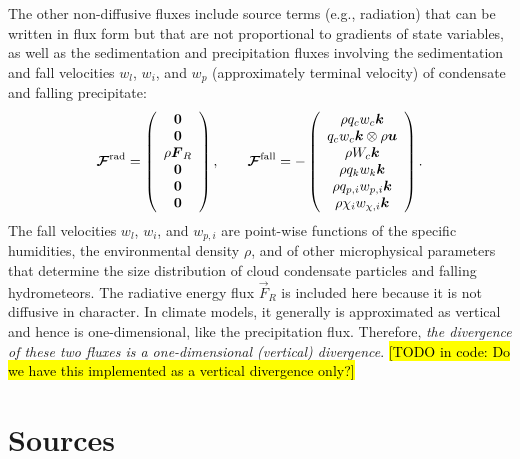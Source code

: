 \documentclass{report}
\begin{document}
The other non-diffusive fluxes include source terms (e.g., radiation) that can be written in flux form but that are not proportional to gradients of state variables, as well as the sedimentation and precipitation fluxes involving the sedimentation and fall velocities $w_l$, $w_i$, and $w_p$ (approximately terminal velocity) of condensate and falling precipitate:
\begin{equation}
\boldsymbol{{\mathcal{F}}}^{\mathrm{rad}} = 
\left( \begin{array}{c}
\boldsymbol{{0}} \\
\boldsymbol{{0}} \\
\rho \boldsymbol{{F}}_R \\
\boldsymbol{{0}} \\
\boldsymbol{{0}} \\
\boldsymbol{{0}} 
\end{array}
\right), \qquad
\boldsymbol{{\mathcal{F}}}^{\mathrm{fall}} = 
- \left( \begin{array}{c}
\rho q_{c} w_{c} \boldsymbol{{k}}  \\
q_c w_c \boldsymbol{{k}} \otimes \rho \boldsymbol{{u}}  \\
\rho W_c \boldsymbol{{k}} \\
\rho q_{k} w_{k} \boldsymbol{{k}}  \\
\rho q_{p,i} w_{p, i} \boldsymbol{{k}} \\
\rho \chi_{i} w_{\chi, i} \boldsymbol{{k}} 
\end{array}
\right).
\label{eq:ndf_flux}
\end{equation}
The fall velocities $w_l$, $w_i$, and $w_{p, i}$ are point-wise functions of the specific humidities, the environmental density $\rho$, and of other microphysical parameters that determine the size distribution of cloud condensate particles and falling hydrometeors. The radiative energy flux $\vec{F}_R$ is included here because it is not diffusive in character. In climate models, it generally is approximated as vertical and hence is one-dimensional, like the precipitation flux. Therefore, \emph{the divergence of these two fluxes is a one-dimensional (vertical) divergence}. \hl{[TODO in code: Do we have this implemented as a vertical divergence only?]}

\section{Sources}
\end{document}
